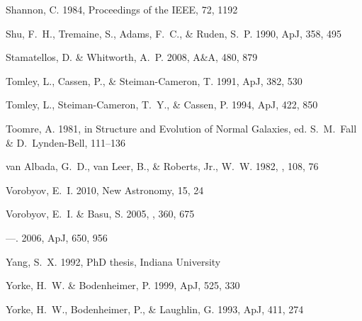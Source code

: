 \documentclass[manuscript]{aastex}
\begin{document}
\begin{thebibliography}{66}
Shannon, C. 1984, Proceedings of the IEEE, 72, 1192

{Shu}, F.~H., {Tremaine}, S., {Adams}, F.~C., \& {Ruden}, S.~P. 1990, ApJ, 358,
  495

{Stamatellos}, D. \& {Whitworth}, A.~P. 2008, A\&A, 480, 879

{Tomley}, L., {Cassen}, P., \& {Steiman-Cameron}, T. 1991, ApJ, 382, 530

{Tomley}, L., {Steiman-Cameron}, T.~Y., \& {Cassen}, P. 1994, ApJ, 422, 850

{Toomre}, A. 1981, in Structure and Evolution of Normal Galaxies, ed.
  {S.~M.~Fall \& D.~Lynden-Bell}, 111--136

{van Albada}, G.~D., {van Leer}, B., \& {Roberts}, Jr., W.~W. 1982, \aap, 108,
  76

{Vorobyov}, E.~I. 2010, New Astronomy, 15, 24

{Vorobyov}, E.~I. \& {Basu}, S. 2005, \mnras, 360, 675

---. 2006, ApJ, 650, 956

{Yang}, S.~X. 1992, PhD thesis, Indiana University

{Yorke}, H.~W. \& {Bodenheimer}, P. 1999, ApJ, 525, 330

{Yorke}, H.~W., {Bodenheimer}, P., \& {Laughlin}, G. 1993, ApJ, 411, 274

\end{thebibliography}


\newpage
\end{document}
